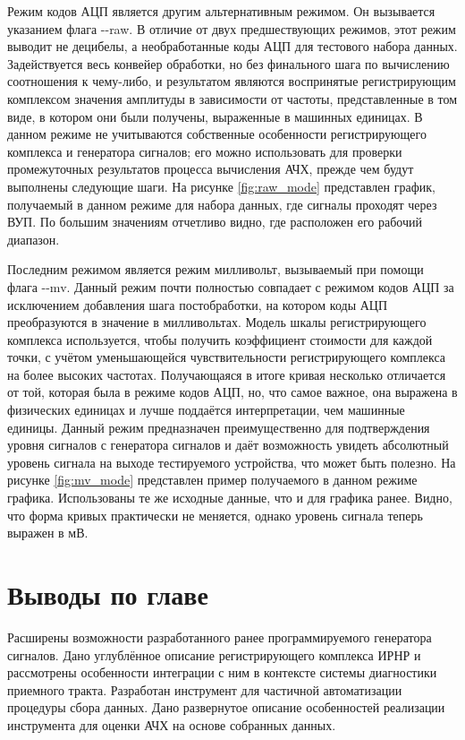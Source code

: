 \documentclass{report}
\begin{document}

Режим кодов АЦП является другим альтернативным режимом. Он вызывается указанием флага -{}-raw. В отличие от двух предшествующих режимов, этот режим выводит не децибелы, а необработанные коды АЦП для тестового набора данных. Задействуется весь конвейер обработки, но без финального шага по вычислению соотношения к чему-либо, и результатом являются воспринятые регистрирующим комплексом значения амплитуды в зависимости от частоты, представленные в том виде, в котором они были получены, выраженные в машинных единицах. В данном режиме не учитываются собственные особенности регистрирующего комплекса и генератора сигналов; его можно использовать для проверки промежуточных результатов процесса вычисления АЧХ, прежде чем будут выполнены следующие шаги. На рисунке \ref{fig:raw_mode} представлен график, получаемый в данном режиме для набора данных, где сигналы проходят через ВУП. По большим значениям отчетливо видно, где расположен его рабочий диапазон.


Последним режимом является режим милливольт, вызываемый при помощи флага -{}-mv. Данный режим почти полностью совпадает с режимом кодов АЦП за исключением добавления шага постобработки, на котором коды АЦП преобразуются в значение в милливольтах. Модель шкалы регистрирующего комплекса используется, чтобы получить коэффициент стоимости для каждой точки, с учётом уменьшающейся чувствительности регистрирующего комплекса на более высоких частотах. Получающаяся в итоге кривая несколько отличается от той, которая была в режиме кодов АЦП, но, что самое важное, она выражена в физических единицах и лучше поддаётся интерпретации, чем машинные единицы. Данный режим предназначен преимущественно для подтверждения уровня сигналов с генератора сигналов и даёт возможность увидеть абсолютный уровень сигнала на выходе тестируемого устройства, что может быть полезно. На рисунке \ref{fig:mv_mode} представлен пример получаемого в данном режиме графика. Использованы те же исходные данные, что и для графика ранее. Видно, что форма кривых практически не меняется, однако уровень сигнала теперь выражен в мВ.


\section*{Выводы по главе}
Расширены возможности разработанного ранее программируемого генератора сигналов. Дано углублённое описание регистрирующего комплекса ИРНР и рассмотрены особенности интеграции с ним в контексте системы диагностики приемного тракта. Разработан инструмент для частичной автоматизации процедуры сбора данных. Дано развернутое описание особенностей реализации инструмента для оценки АЧХ на основе собранных данных.
\end{document}
